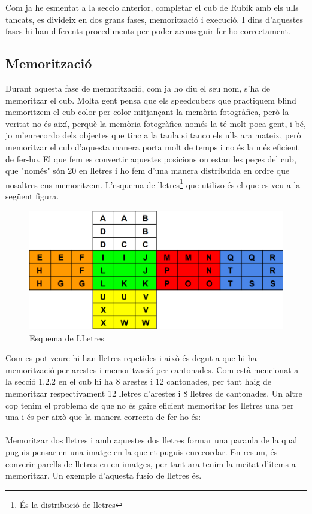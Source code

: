 Com ja he esmentat a la seccio anterior, completar el cub de Rubik amb els ulls tancats, es divideix en dos grans fases, memorització i execució. I dins d'aquestes fases hi han diferents procediments per poder aconseguir fer-ho correctament.

\subsection{Memorització}

Durant aquesta fase de memorització, com ja ho diu el seu nom, s'ha de memoritzar el cub. Molta gent pensa que els speedcubers que practiquem blind memoritzem el cub color per color mitjançant la memòria fotogràfica, però la veritat no és així, perquè la memòria fotogràfica només la té molt poca gent, i bé, jo m'enrecordo dels objectes que tinc a la taula si tanco els ulls ara mateix, però memoritzar el cub d'aquesta manera porta molt de temps i no és la més eficient de fer-ho.
El que fem es convertir aquestes posicions on estan les peçes del cub, que "només" són 20 en lletres i ho fem d'una manera distribuida en ordre que nosaltres ens memoritzem. L'esquema de lletres\footnote{És la distribució de lletres} que utilizo és el que es veu a la següent figura.

\begin{figure}[ht]
    \centering
    \includegraphics[width=12cm]{img/figures/letter-scheme.png}
\caption{Esquema de LLetres}
    \label{fig:letter-scheme}
\end{figure}

Com es pot veure hi han lletres repetides i això és degut a que hi ha memorització per arestes i memorització per cantonades. Com està mencionat a la secció 1.2.2 en el cub hi ha 8 arestes i 12 cantonades, per tant haig de memoritzar respectivament 12 lletres d'arestes i 8 lletres de cantonades.
Un altre cop tenim el problema de que no és gaire eficient memoritar les lletres una per una i és per això que la manera correcta de fer-ho és:
\\\\Memoritzar dos lletres i amb aquestes dos lletres formar una paraula de la qual puguis pensar en una imatge en la que et puguis enrecordar. En resum, és converir parells de lletres en en imatges, per tant ara tenim la meitat d'ítems a memoritzar. Un exemple d'aquesta fusío de lletres és. 
\vspace{0.25cm}


